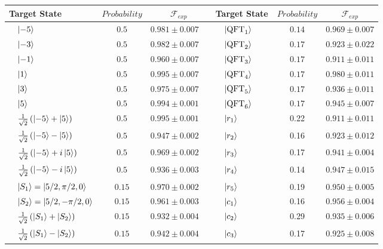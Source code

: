 \begin{table}[tbh]
\centering\footnotesize
\begin{tabular}{lcc|lcc}
\toprule
Target State & $Probability$  & $\mathcal{F}_{exp}$  & Target State & $Probability$  & $\mathcal{F}_{exp}$ \\
\midrule
 $\quad\ket{-5}$ & $0.5$  & $0.981 \pm 0.007\quad$ & $\quad\ket{\operatorname{QFT}_1}\qquad $ & $0.14$ & $0.969\pm 0.007$\\
 $\quad\ket{-3}$ & $0.5$ & $0.982 \pm 0.007\quad$ & $\quad\ket{\operatorname{QFT}_2}$ & $0.17$ & $0.923\pm 0.022$ \\
 $\quad\ket{-1}$ & $0.5$ & $0.960 \pm 0.007\quad$ & $\quad\ket{\operatorname{QFT}_3}$ & $0.17$ & $0.911\pm 0.011$\\ 
 $\quad\ket{1}$ & $0.5$ & $0.995 \pm 0.007\quad$ & $\quad\ket{\operatorname{QFT}_4}$&$0.17$ &  $0.980\pm 0.011$ \\
 $\quad\ket{3}$ & $0.5$ & $0.975 \pm 0.007\quad$ & $\quad\ket{\operatorname{QFT}_5 }$& $0.17$& $0.936\pm 0.011$ \\
 $\quad\ket{5}$ & $0.5$ & $0.994 \pm 0.001\quad$ & $\quad\ket{\operatorname{QFT}_6} $& $0.17$ & $0.945\pm 0.007$ \\
 $\quad\frac{1}{\sqrt{2}}\left(\ket{-5}+\ket{5} \right)$ & $0.5$  & $0.995 \pm 0.001\quad$ &$\quad\ket{r_1}$ & 0.22& $0.911\pm0.011$\\
 $\quad\frac{1}{\sqrt{2}}\left(\ket{-5}-\ket{5}\right)$ & $0.5$ & $0.947 \pm 0.002\quad$ &$\quad\ket{r_2}$  & 0.16 & $0.923 \pm 0.012$\\
 $\quad\frac{1}{\sqrt{2}}\left(\ket{-5}+i\ket{5}\right)$ & $0.5$ & $0.969 \pm 0.002\quad$ &$\quad\ket{r_3}$  & 0.17 & $0.941 \pm 0.004$\\ 
  $\quad\frac{1}{\sqrt{2}}\left(\ket{-5}-i\ket{5}\right)$ & $0.5$ & $0.936 \pm 0.003\quad$&$\quad\ket{r_4} $& 0.14 &$0.947 \pm 0.015$  \\
 $\quad\ket{S_1}=\ket{5/2,\pi /2,0}$ & $0.15$ & $0.970 \pm 0.002\quad$ &$\quad\ket{r_5}$ & 0.19 & $0.950\pm0.005$  \\
 $\quad\ket{S_2}=\ket{5/2,-\pi /2,0}$ & $0.15$ & $0.961 \pm 0.003\quad$ &$\quad\ket{c_1}$ &0.16 & $0.956\pm0.004$ \\
 $\quad\frac{1}{\sqrt{2}}\left(\ket{S_1}+\ket{S_2}\right)$ & $0.15$ & $0.932 \pm 0.004\quad$&$\quad\ket{c_2}$ & 0.29 &$0.935 \pm 0.006$  \\
 $\quad\frac{1}{\sqrt{2}}\left(\ket{S_1}-\ket{S_2}\right)$ & $0.15$ & $0.942 \pm 0.004\quad$& $\quad\ket{c_3}$& 0.17 & $0.925\pm 0.008$ \\

\end{tabular}
\end{table}
